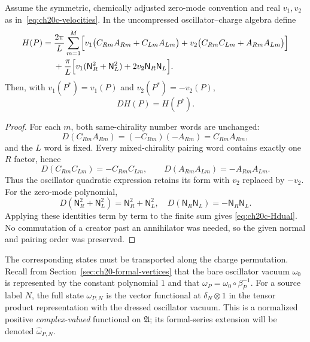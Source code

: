 \begin{theorem}
\label{thm:ch20c-H}
Assume the symmetric, chemically adjusted zero-mode convention and
real $v_1,v_2$ as in~\eqref{eq:ch20c-velocities}.  In the
uncompressed oscillator--charge algebra define
\begin{align}
 H(P)={}&\frac{2\pi}{L}\sum_{m=1}^{M}\Bigl[
 v_1\bigl(C_{Rm}A_{Rm}+C_{Lm}A_{Lm}\bigr)
 +v_2\bigl(C_{Rm}C_{Lm}+A_{Rm}A_{Lm}\bigr)\Bigr]
 \nonumber\\
 &+\frac{\pi}{L}\Bigl[
 v_1(\mathsf N_R^2+\mathsf N_L^2)
 +2v_2\mathsf N_R\mathsf N_L\Bigr].
 \label{eq:ch20c-H}
\end{align}
Then, with $v_1(P^*)=v_1(P)$ and $v_2(P^*)=-v_2(P)$,
\begin{equation}
 D H(P)=H(P^*).
 \label{eq:ch20c-Hdual}
\end{equation}
\end{theorem}
\begin{proof}
For each $m$, both same-chirality number words are unchanged:
\[
 D(C_{Rm}A_{Rm})=(-C_{Rm})(-A_{Rm})=C_{Rm}A_{Rm},
\]
and the $L$ word is fixed.  Every mixed-chirality pairing word
contains exactly one $R$ factor, hence
\[
 D(C_{Rm}C_{Lm})=-C_{Rm}C_{Lm},\qquad
 D(A_{Rm}A_{Lm})=-A_{Rm}A_{Lm}.
\]
Thus the oscillator quadratic expression retains its form with
$v_2$ replaced by $-v_2$.  For the zero-mode polynomial,
\[
 D(\mathsf N_R^2+\mathsf N_L^2)
 =\mathsf N_R^2+\mathsf N_L^2,\quad
 D(\mathsf N_R\mathsf N_L)=-\mathsf N_R\mathsf N_L.
\]
Applying these identities term by term to the finite sum gives
\eqref{eq:ch20c-Hdual}.  No commutation of a creator past an
annihilator was needed, so the given normal and pairing order was
preserved.
\end{proof}

The corresponding states must be transported along the charge
permutation.  Recall from Section~\ref{sec:ch20-formal-vertices}
that the bare oscillator vacuum $\omega_0$ is represented by the
constant polynomial $1$ and that
$\omega_P=\omega_0\circ\beta_P^{-1}$.  For a source label $N$, the
full state $\omega_{P,N}$ is the vector functional at
$\delta_N\otimes1$ in the tensor product representation with the
dressed oscillator vacuum.  This is a normalized positive
\emph{complex-valued} functional on $\mathfrak A$; its formal-series
extension will be denoted $\widehat\omega_{P,N}$.

